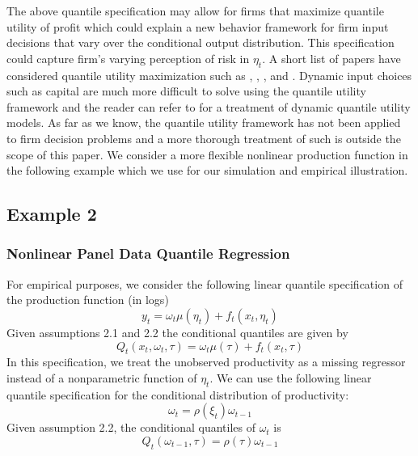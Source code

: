 \documentclass{article}
\begin{document}
The above quantile specification may allow for firms that maximize quantile utility of profit which could explain a new behavior framework for firm input decisions that vary over the conditional output distribution. This specification could capture firm's varying perception of risk in $\eta_{t}$. A short list of papers have considered quantile utility maximization such as \cite{Manski1988}, \cite{ROSTEK2009}, \cite{Chambers2007}, and \cite{Bhattacharya2009}. Dynamic input choices such as capital are much more difficult to solve using the quantile utility framework and the reader can refer to \cite{Castro2017} for a treatment of dynamic quantile utility models. As far as we know, the quantile utility framework has not been applied to firm decision problems and a more thorough treatment of such is outside the scope of this paper. We consider a more flexible nonlinear production function in the following example which we use for our simulation and empirical illustration.

\subsection{Example 2}
\subsubsection{Nonlinear Panel Data Quantile Regression}
For empirical purposes, we consider the following linear quantile specification of the production function (in logs)
\begin{equation}\label{randomcoefficient}
y_{t}=\omega_{t}\mu(\eta_{t})+f_{t}(x_{t}, \eta_{t})
\end{equation} 
Given assumptions 2.1 and 2.2 the conditional quantiles are given by
\begin{equation}\label{qrandomcoefficient}
Q_{t}(x_{t}, \omega_{t}, \tau)=\omega_{t}\mu(\tau)+f_{t}(x_{t}, \tau)
\end{equation}
In this specification, we treat the unobserved productivity as a missing regressor instead of a nonparametric function of $\eta_{t}$. We can use the following linear quantile specification for the conditional distribution of productivity:
\begin{equation}\label{omegacoef}
\omega_{t}=\rho(\xi_{t})\omega_{t-1}
\end{equation}
Given assumption 2.2, the conditional quantiles of $\omega_{t}$ is
\begin{equation}\label{qomegacoef}
 Q_{t}(\omega_{t-1}, \tau)=\rho(\tau)\omega_{t-1}
\end{equation}
\end{document}
